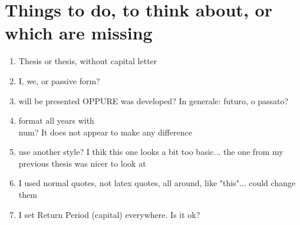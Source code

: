 
\chapter{Things to do, to think about, or which are missing}
\begin{enumerate}
\item Thesis or thesis, without capital letter
\item I, we, or passive form?
\item will be presented OPPURE was developed? In generale: futuro, o passato?
\item format all years with \\num? It does not appear to make any difference
\item use another style? I thik this one looks a bit too basic... the one from my previous thesis was nicer to look at
\item I used normal quotes, not latex quotes, all around, like "this"... could change them
\item I set Return Period (capital) everywhere. Is it ok?
\end{enumerate}